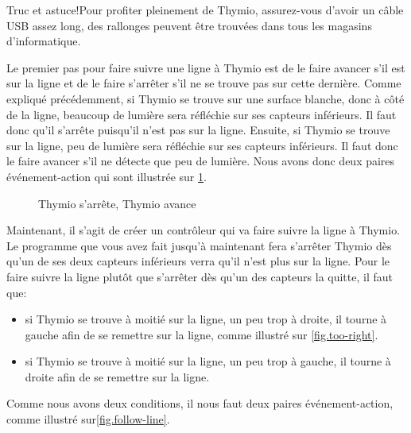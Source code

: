 \begin{bclogo}[couleur = blue!30, arrondi = 0.1, logo = \bcinfo, ombre = true]{Truc et astuce!}Pour profiter pleinement de Thymio, assurez-vous d'avoir un câble USB assez long, des rallonges peuvent être trouvées dans tous les magasins d'informatique.
\end{bclogo}


Le premier pas pour faire suivre une ligne à Thymio est de le faire avancer s'il est sur la ligne et de le faire s'arrêter s'il ne se trouve pas sur cette dernière. Comme expliqué précédemment, si Thymio se trouve sur une surface blanche, donc à côté de la ligne, beaucoup de lumière sera réfléchie sur ses capteurs inférieurs. Il faut donc qu'il s'arrête puisqu'il n'est pas sur la ligne. Ensuite, si Thymio se trouve sur la ligne, peu de lumière sera réfléchie sur ses capteurs inférieurs. Il faut donc le faire avancer s'il ne détecte que peu de lumière. Nous avons donc deux paires événement-action qui sont illustrée sur \cref{fig.start-stop}.

\begin{figure}[h]
\begin{center}
\caption{Thymio s'arrête, Thymio avance}\label{fig.start-stop}
\end{center}
\end{figure}


Maintenant, il s'agit de créer un contrôleur qui va faire suivre la ligne à Thymio. Le programme que vous avez fait jusqu'à maintenant fera s'arrêter Thymio dès qu'un de ses deux capteurs inférieurs verra qu'il n'est plus sur la ligne. Pour le faire suivre la ligne plutôt que s'arrêter dès qu'un des capteurs la quitte, il faut que: 

\begin{itemize}
	\item si Thymio se trouve à moitié sur la ligne, un peu trop à droite, il tourne à gauche afin de se remettre sur la ligne, comme illustré sur \cref{fig.too-right}.
	\item  si Thymio se trouve à moitié sur la ligne, un peu trop à gauche, il tourne à droite afin de se remettre sur la ligne.
\end{itemize}

Comme nous avons deux conditions, il nous faut deux paires événement-action, comme illustré sur\cref{fig.follow-line}.

